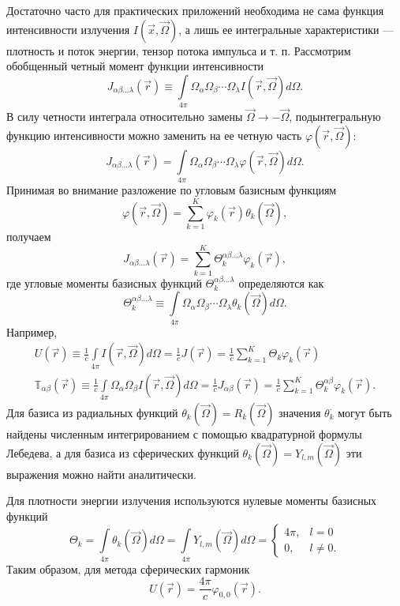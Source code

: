 Достаточно часто для практических приложений необходима не сама функция интенсивности излучения $I(\vec x, \vec \Omega)$, а лишь ее интегральные характеристики --- плотность и поток энергии, тензор потока импульса и т. п. Рассмотрим обобщенный четный момент функции интенсивности
\[
J_{\alpha\beta\dots\lambda}(\vec r) \equiv \int\limits_{4\pi} \Omega_\alpha \Omega_\beta \cdots \Omega_\lambda I(\vec r, \vec \Omega) d\Omega.
\]
В силу четности интеграла относительно замены $\vec \Omega \to -\vec \Omega$, подынтегральную функцию интенсивности можно заменить на ее четную часть $\varphi(\vec r, \vec \Omega)$:
\[
J_{\alpha\beta\dots\lambda}(\vec r) = \int\limits_{4\pi} \Omega_\alpha \Omega_\beta \cdots \Omega_\lambda \varphi(\vec r, \vec \Omega) d\Omega.
\]
Принимая во внимание разложение по угловым базисным функциям
\[
\varphi(\vec r, \vec \Omega) = \sum_{k = 1}^{K} \varphi_k(\vec r) \theta_k(\vec \Omega),
\]
получаем
\[
J_{\alpha\beta\dots\lambda}(\vec r) = \sum_{k=1}^{K} \Theta_k^{\alpha\beta\dots\lambda} \varphi_k(\vec r),
\]
где угловые моменты базисных функций $\Theta_k^{\alpha\beta\dots\lambda}$ определяются как
\[
\Theta_k^{\alpha\beta\dots\lambda} \equiv \int\limits_{4\pi} \Omega_\alpha \Omega_\beta \cdots \Omega_\lambda \theta_k(\vec \Omega) d\Omega.
\]
Например, 
\begin{gather*}
U(\vec r) \equiv \frac{1}{c}\int\limits_{4\pi} I(\vec r, \vec \Omega) d\Omega = \frac{1}{c} J(\vec r) = \frac{1}{c} \sum_{k=1}^{K} \Theta_k \varphi_k(\vec r)\\
\mathbb T_{\alpha\beta}(\vec r) \equiv \frac{1}{c}\int\limits_{4\pi} \Omega_\alpha \Omega_\beta I(\vec r, \vec \Omega) d\Omega = \frac{1}{c} J_{\alpha\beta}(\vec r) = \frac{1}{c} \sum_{k=1}^{K} \Theta_k^{\alpha\beta} \varphi_k(\vec r).
\end{gather*}
Для базиса из радиальных функций $\theta_k(\vec \Omega) = R_k(\vec \Omega)$ значения $\theta_{k}^{\cdot}$ могут быть найдены численным интегрированием с помощью квадратурной формулы Лебедева, а для базиса из сферических функций $\theta_k(\vec \Omega) = Y_{l,m}(\vec \Omega)$ эти выражения можно найти аналитически.

Для плотности энергии излучения используются нулевые моменты базисных функций
\[
\Theta_k = \int\limits_{4\pi} \theta_k(\vec \Omega) d\Omega = 
\int\limits_{4\pi} Y_{l,m}(\vec \Omega) d\Omega = 
\begin{cases}
4\pi, &l = 0\\
0, &l \neq 0.
\end{cases}
\]
Таким образом, для метода сферических гармоник
\[
U(\vec r) = \frac{4\pi}{c} \varphi_{0,0}(\vec r).
\]

